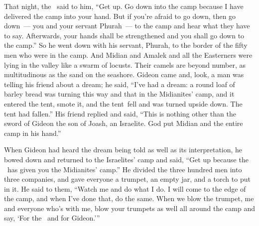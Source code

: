 \begin{inparaenum}
   That night, the \lord\ said to him, ``Get up. Go down into the camp because I have delivered the camp into your hand.%
   But if you're afraid to go down, then go down~--- you and your servant Phurah~--- to the camp%
   and hear what they have to say. Afterwards, your hands shall be strengthened and you shall go down to the camp.'' So he went down with his servant, Phurah, to the border of the fifty men who were in the camp.%
   And Midian and Amalek and all the Easterners were lying in the valley like a swarm of locusts. Their camels are beyond number, as multitudinous as the sand on the seashore.%
   Gideon came and, look, a man was telling his friend about a dream; he said, ``I've had a dream: a round loaf of barley bread was turning this way and that in the Midianites' camp, and it entered the tent, smote it, and the tent\understood\ fell and was turned upside down. The tent had fallen.''%
   His friend replied and said, ``This is nothing other than the sword of Gideon the son of Joash, an Israelite. God put Midian and the entire camp in his hand.''%
  
   When Gideon had heard the dream being told as well as its interpretation, he bowed down and returned to the Israelites' camp and said, ``Get up because the \lord\ has given you the Midianites' camp.''%
   He divided the three hundred men into three companies, and gave everyone a trumpet, an empty jar, and a torch to put in it.%
   He said to them, ``Watch me and do what I do. I will come to the edge of the camp, and when I've done that, do the same.%
   When we blow the trumpet, me and everyone who's with me, blow your trumpets as well all around the camp and say, `For the \lord\ and for Gideon.'\thinspace''%
  

\end{inparaenum}
